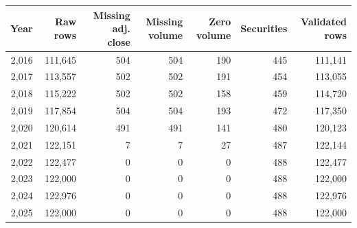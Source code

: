 \begin{tabular}{@{}rrrrrrr@{}}
\toprule
Year & Raw rows & Missing adj. close & Missing volume & Zero volume & Securities & Validated rows \\
\midrule
2,016 & 111,645 & 504 & 504 & 190 & 445 & 111,141 \\
2,017 & 113,557 & 502 & 502 & 191 & 454 & 113,055 \\
2,018 & 115,222 & 502 & 502 & 158 & 459 & 114,720 \\
2,019 & 117,854 & 504 & 504 & 193 & 472 & 117,350 \\
2,020 & 120,614 & 491 & 491 & 141 & 480 & 120,123 \\
2,021 & 122,151 & 7 & 7 & 27 & 487 & 122,144 \\
2,022 & 122,477 & 0 & 0 & 0 & 488 & 122,477 \\
2,023 & 122,000 & 0 & 0 & 0 & 488 & 122,000 \\
2,024 & 122,976 & 0 & 0 & 0 & 488 & 122,976 \\
2,025 & 122,000 & 0 & 0 & 0 & 488 & 122,000 \\
\bottomrule
\end{tabular}
